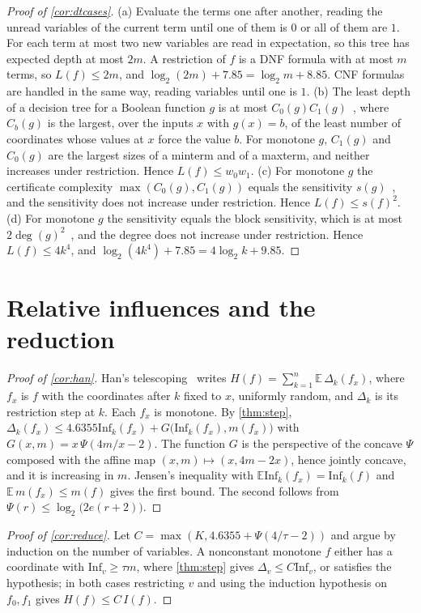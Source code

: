 \documentclass[11pt]{amsart}
\theoremstyle{remark}
\newcommand{\E}{\mathbb{E}}
\newcommand{\Inf}{\mathrm{Inf}}
\begin{document}
\begin{proof}[Proof of \cref{cor:dtcases}]
(a) Evaluate the terms one after another, reading the unread variables of the current term until one of them is $0$
or all of them are $1$. For each term at most two new variables are read in expectation, so this tree has expected
depth at most $2m$. A restriction of $f$ is a DNF formula with at most $m$ terms, so $L(f)\le2m$, and
$\log_2(2m)+7.85=\log_2m+8.85$. CNF formulas are handled in the same way, reading variables until one is $1$.
(b) The least depth of a decision tree for a Boolean function $g$ is at most $C_0(g)C_1(g)$~\cite{BdW02}, where $C_b(g)$
is the largest, over the inputs $x$ with $g(x)=b$, of the least number of coordinates whose values at $x$ force the
value $b$. For monotone $g$, $C_1(g)$ and $C_0(g)$ are the largest sizes of a minterm and of a maxterm, and neither
increases under restriction. Hence $L(f)\le w_0w_1$.
(c) For monotone $g$ the certificate complexity $\max(C_0(g),C_1(g))$ equals the sensitivity $s(g)$~\cite{BdW02}, and
the sensitivity does not increase under restriction. Hence $L(f)\le s(f)^2$.
(d) For monotone $g$ the sensitivity equals the block sensitivity, which is at most $2\deg(g)^2$~\cite{BdW02}, and the
degree does not increase under restriction. Hence $L(f)\le4k^4$, and $\log_2(4k^4)+7.85=4\log_2k+9.85$.
\end{proof}

\section{Relative influences and the reduction}

\begin{proof}[Proof of \cref{cor:han}]
Han's telescoping~\cite[(3.4)]{Han25} writes $H(f)=\sum_{k=1}^n\E\,\Delta_k(f_{x})$, where $f_x$ is $f$ with the
coordinates after $k$ fixed to $x$, uniformly random, and $\Delta_k$ is its restriction step at $k$. Each $f_x$ is
monotone. By \cref{thm:step},
$\Delta_k(f_x)\le 4.6355\Inf_k(f_x)+G\bigl(\Inf_k(f_x),m(f_x)\bigr)$ with $G(x,m)=x\,\Psi(4m/x-2)$. The function $G$ is
the perspective of the concave $\Psi$ composed with the affine map $(x,m)\mapsto(x,4m-2x)$, hence jointly concave, and
it is increasing in $m$. Jensen's inequality with $\E\Inf_k(f_x)=\Inf_k(f)$ and $\E\,m(f_x)\le m(f)$ gives the first
bound. The second follows from $\Psi(r)\le\log_2\bigl(2e(r+2)\bigr)$.
\end{proof}

\begin{proof}[Proof of \cref{cor:reduce}]
Let $C=\max(K,4.6355+\Psi(4/\tau-2))$ and argue by induction on the number of variables. A nonconstant monotone $f$
either has a coordinate with $\Inf_v\ge\tau m$, where \cref{thm:step} gives $\Delta_v\le C\Inf_v$, or satisfies the
hypothesis; in both cases restricting $v$ and using the induction hypothesis on $f_0,f_1$ gives $H(f)\le C\,I(f)$.
\end{proof}
\end{document}
